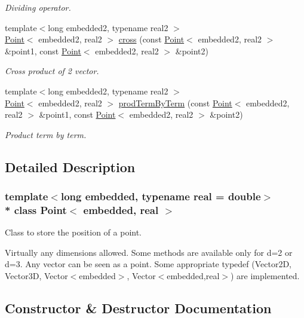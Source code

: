 \begin{DoxyCompactItemize}
\begin{DoxyCompactList}\small\item\em Dividing operator. \end{DoxyCompactList}\item 
{\footnotesize template$<$long embedded2, typename real2 $>$ }\\\hyperlink{class_point}{Point}$<$ embedded2, real2 $>$ \hyperlink{class_point_a951dd5bf519f7daabc4ba4e61657cc26}{cross} (const \hyperlink{class_point}{Point}$<$ embedded2, real2 $>$ \&point1, const \hyperlink{class_point}{Point}$<$ embedded2, real2 $>$ \&point2)
\begin{DoxyCompactList}\small\item\em Cross product of 2 vector. \end{DoxyCompactList}\item 
{\footnotesize template$<$long embedded2, typename real2 $>$ }\\\hyperlink{class_point}{Point}$<$ embedded2, real2 $>$ \hyperlink{class_point_a94ebaad0db80d547a452cba37e98e1ca}{prod\+Term\+By\+Term} (const \hyperlink{class_point}{Point}$<$ embedded2, real2 $>$ \&point1, const \hyperlink{class_point}{Point}$<$ embedded2, real2 $>$ \&point2)
\begin{DoxyCompactList}\small\item\em Product term by term. \end{DoxyCompactList}\end{DoxyCompactItemize}


\subsection{Detailed Description}
\subsubsection*{template$<$long embedded, typename real = double$>$\\*
class Point$<$ embedded, real $>$}

Class to store the position of a point. 

Virtually any dimensions allowed. Some methods are available only for d=2 or d=3. Any vector can be seen as a point. Some appropriate typedef (Vector2D, Vector3D, Vector$<$embedded$>$, Vector$<$embedded,real$>$) are implemented. 

\subsection{Constructor \& Destructor Documentation}
